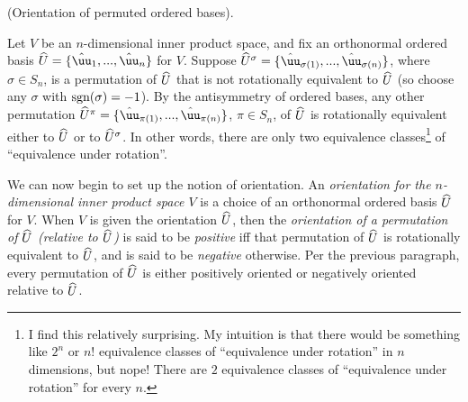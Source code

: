 \begin{defn}
    (Orientation of permuted ordered bases).
    
    Let $V$ be an $n$-dimensional inner product space, and fix an orthonormal ordered basis $\hU = \{\huu_1, ..., \huu_n\}$ for $V$. Suppose $\hU^\sigma = \{\huu_{\sigma(1)}, ..., \huu_{\sigma(n)}\}$, where $\sigma \in S_n$, is a permutation of $\widehat{U}$ that is not rotationally equivalent to $\widehat{U}$ (so choose any $\sigma$ with $\text{sgn}(\sigma) = - 1$). By the antisymmetry of ordered bases, any other permutation $\hU^\pi = \{\huu_{\pi(1)}, ..., \huu_{\pi(n)}\}$, $\pi \in S_n$, of $\widehat{U}$ is rotationally equivalent either to $\widehat{U}$ or to $\widehat{U}^\sigma$. In other words, there are only two equivalence classes\footnote{I find this relatively surprising. My intuition is that there would be something like $2^n$ or $n!$ equivalence classes of ``equivalence under rotation'' in $n$ dimensions, but nope! There are $2$ equivalence classes of ``equivalence under rotation'' for every $n$.} of ``equivalence under rotation''.
    
    We can now begin to set up the notion of orientation. An \textit{orientation for the $n$-dimensional inner product space $V$} is a choice of an orthonormal ordered basis $\widehat{U}$ for $V$. When $V$ is given the orientation $\widehat{U}$, then the \textit{orientation of a permutation of $\widehat{U}$ (relative to $\widehat{U}$)} is said to be \textit{positive} iff that permutation of $\widehat{U}$ is rotationally equivalent to $\widehat{U}$, and is said to be \textit{negative} otherwise. Per the previous paragraph, every permutation of $\widehat{U}$ is either positively oriented or negatively oriented relative to $\widehat{U}$.
\end{defn}

